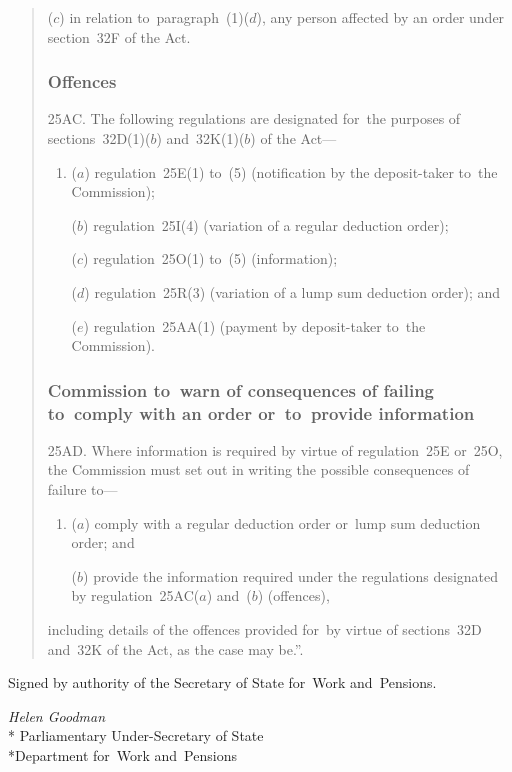 \documentclass[12pt,a4paper]{article}
\begin{document}
\begin{quotation}
\begin{enumerate}
($c$) in relation to~paragraph~(1)($d$), any person affected by an order under section~32F of the Act.
\end{enumerate}

\subsubsection*{Offences}

25AC. The following regulations are designated for~the purposes of sections~32D(1)($b$)  and~32K(1)($b$)  of the Act—
\begin{enumerate}\item[]
($a$) regulation~25E(1) to~(5) (notification by the deposit-taker to~the Commission);

($b$) regulation~25I(4) (variation of a regular deduction order);

($c$) regulation~25O(1) to~(5) (information);

($d$) regulation~25R(3) (variation of a lump sum deduction order); and

($e$) regulation~25AA(1) (payment by deposit-taker to~the Commission).
\end{enumerate}

\subsubsection*{Commission to~warn of consequences of failing to~comply with an order or~to~provide information}

25AD.  Where information is required by virtue of regulation~25E or~25O, the Commission must set out in writing the possible consequences of failure to—
\begin{enumerate}\item[]
($a$) comply with a regular deduction order or~lump sum deduction order; and

($b$) provide the information required under the regulations designated by regulation~25AC($a$)  and~($b$)  (offences),
\end{enumerate}
including details of the offences provided for~by virtue of sections~32D and~32K of the   Act, as the case may be.”.
\end{quotation}

\bigskip

\pagebreak[3]

Signed 
by authority of the 
Secretary of State for~Work and~Pensions.

{\raggedleft
\emph{Helen Goodman}\\*
Parliamentary Under-Secretary 
of State\\*Department 
for~Work and~Pensions

}
\end{document}
